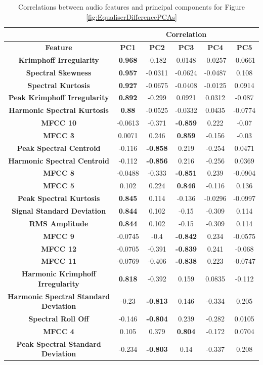		\begin{table}
			\centering
			\begin{tabular}{|c|c|c|c|c|c|}
				\cline{2-6}
				\multicolumn{1}{c|}{} & \multicolumn{5}{c|}{\bf{Correlation}} \tabularnewline
				\hline
				\bf{Feature} & \bf{PC1} & \bf{PC2} & \bf{PC3} & \bf{PC4} & \bf{PC5} \tabularnewline
				\hline
				\hline
				\bf{Krimphoff Irregularity} & \bf{0.968} & -0.182 & 0.0148 & -0.0257 & -0.0661 \tabularnewline
				\hline
				\bf{Spectral Skewness} & \bf{0.957} & -0.0311 & -0.0624 & -0.0487 & 0.108 \tabularnewline
				\hline
				\bf{Spectral Kurtosis} & \bf{0.927} & -0.0675 & -0.0408 & -0.0125 & 0.0914 \tabularnewline
				\hline
				\bf{Peak Krimphoff Irregularity} & \bf{0.892} & -0.299 & 0.0921 & 0.0312 & -0.087 \tabularnewline
				\hline
				\bf{Harmonic Spectral Kurtosis} & \bf{0.88} & -0.0525 & -0.0332 & 0.0435 & -0.0774 \tabularnewline
				\hline
				\bf{MFCC 10} & -0.0613 & -0.371 & \bf{-0.859} & 0.222 & -0.07 \tabularnewline
				\hline
				\bf{MFCC 3} & 0.0071 & 0.246 & \bf{0.859} & -0.156 & -0.03 \tabularnewline
				\hline
				\bf{Peak Spectral Centroid} & -0.116 & \bf{-0.858} & 0.219 & -0.254 & 0.0471 \tabularnewline
				\hline
				\bf{Harmonic Spectral Centroid} & -0.112 & \bf{-0.856} & 0.216 & -0.256 & 0.0369 \tabularnewline
				\hline
				\bf{MFCC 8} & -0.0488 & -0.333 & \bf{-0.851} & 0.239 & -0.0904 \tabularnewline
				\hline
				\bf{MFCC 5} & 0.102 & 0.224 & \bf{0.846} & -0.116 & 0.136 \tabularnewline
				\hline
				\bf{Peak Spectral Kurtosis} & \bf{0.845} & 0.114 & -0.136 & -0.0296 & -0.0997 \tabularnewline
				\hline
				\bf{Signal Standard Deviation} & \bf{0.844} & 0.102 & -0.15 & -0.309 & 0.114 \tabularnewline
				\hline
				\bf{RMS Amplitude} & \bf{0.844} & 0.102 & -0.15 & -0.309 & 0.114 \tabularnewline
				\hline
				\bf{MFCC 9} & -0.0745 & -0.4 & \bf{-0.842} & 0.234 & -0.0575 \tabularnewline
				\hline
				\bf{MFCC 12} & -0.0705 & -0.391 & \bf{-0.839} & 0.241 & -0.068 \tabularnewline
				\hline
				\bf{MFCC 11} & -0.0769 & -0.406 & \bf{-0.838} & 0.223 & -0.0747 \tabularnewline
				\hline
				\bf{Harmonic Krimphoff Irregularity} & \bf{0.818} & -0.392 & 0.159 & 0.0835 & -0.112 \tabularnewline
				\hline
				\bf{Harmonic Spectral Standard Deviation} & -0.23 & \bf{-0.813} & 0.146 & -0.334 & 0.205 \tabularnewline
				\hline
				\bf{Spectral Roll Off} & -0.146 & \bf{-0.804} & 0.239 & -0.282 & 0.0105 \tabularnewline
				\hline
				\bf{MFCC 4} & 0.105 & 0.379 & \bf{0.804} & -0.172 & 0.0704 \tabularnewline
				\hline
				\bf{Peak Spectral Standard Deviation} & -0.234 & \bf{-0.803} & 0.14 & -0.337 & 0.208 \tabularnewline
				\hline
			\end{tabular}
			\caption{Correlations between audio features and principal components for Figure
				 \ref{fig:EqualiserDifferencePCAs}}
			\label{fig:EqualiserDifferenceCorrelations}
		\end{table}

